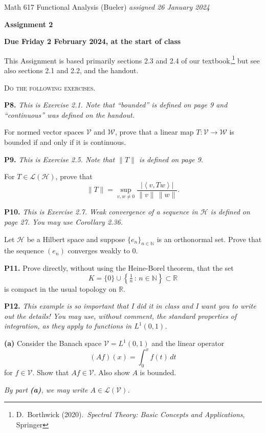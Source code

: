 \documentclass[12pt]{amsart}
\newcommand{\cH}{\mathcal{H}}
\newcommand{\cL}{\mathcal{L}}
\newcommand{\cV}{\mathcal{V}}
\newcommand{\cW}{\mathcal{W}}
\newcommand{\NN}{\mathbb{N}}
\newcommand{\RR}{\mathbb{R}}
\newcommand{\ip}[2]{\ensuremath{\left<#1,#2\right>}}
\newcommand{\prob}[1]{\bigskip\noindent\textbf{#1.}\quad }
\newcommand{\epart}[1]{\medskip\noindent\textbf{(#1)}\quad }
\newcommand{\nex}{\medskip\noindent}
\begin{document}
\scriptsize \noindent Math 617 Functional Analysis (Bueler) \hfill \emph{assigned 26 January 2024}
\normalsize\medskip

\Large\centerline{\textbf{Assignment 2}}
\large
\medskip

\centerline{\textbf{Due Friday 2 February 2024, at the start of class}}
\medskip
\normalsize

\thispagestyle{empty}

\bigskip
\noindent This Assignment is based primarily sections 2.3 and 2.4 of our textbook,\footnote{D.~Borthwick (2020).~\emph{Spectral Theory: Basic Concepts and Applications}, Springer} but see also sections 2.1 and 2.2, and the handout.

\medskip
\noindent \textsc{Do the following exercises.}
\smallskip

\prob{P8}  \emph{This is Exercise 2.1.  Note that ``bounded'' is defined on page 9 and ``continuous'' was defined on the handout.}

\nex For normed vector spaces $\cV$ and $\cW$, prove that a linear map $T:\cV\to\cW$ is bounded if and only if it is continuous.


\prob{P9}  \emph{This is Exercise 2.5.  Note that $\|T\|$ is defined on page 9.}

\nex For $T\in\cL(\cH)$, prove that
	$$\|T\| = \sup_{v,w\ne 0} \frac{|\ip{v}{Tw}|}{\|v\|\,\|w\|}.$$


\prob{P10}  \emph{This is Exercise 2.7.  Weak convergence of a sequence in $\cH$ is defined on page 27.  You may use Corollary 2.36.}

\nex Let $\cH$ be a Hilbert space and suppose $\{e_n\}_{n\in\NN}$ is an orthonormal set.  Prove that the sequence $(e_n)$ converges weakly to 0. 


\prob{P11}  Prove directly, without using the Heine-Borel theorem, that the set
	$$K = \{0\} \cup \left\{\tfrac{1}{n}\,:\,n \in \NN\right\} \subset \RR$$
is compact in the usual topology on $\RR$.


\clearpage \newpage
\prob{P12}  \emph{This example is so important that I did it in class \emph{and} I want you to write out the details!  You may use, without comment, the standard properties of integration, as they apply to functions in $L^1(0,1)$.}

\epart{a}  Consider the Banach space $\cV = L^1(0,1)$ and the linear operator
	$$(Af)(x) = \int_0^x f(t)\,dt$$
for $f\in\cV$.  Show that $Af \in \cV$.  Also show $A$ is bounded.

\nex \emph{By part \emph{\textbf{(a)}}, we may write $A\in\cL(\cV)$.}
\end{document}
